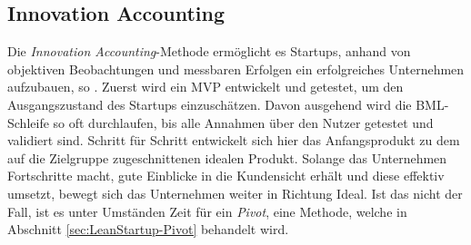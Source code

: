 \subsection*{\label{sec:LeanStartup-InnovationAccounting}\thesubsection\quad Innovation Accounting}
Die \textit{Innovation Accounting}-Methode ermöglicht es Startups, anhand von objektiven Beobachtungen und messbaren Erfolgen ein erfolgreiches Unternehmen aufzubauen, so \citeauthor{TheLeanStartup}. Zuerst wird ein \ac{MVP} entwickelt und getestet, um den Ausgangszustand des Startups einzuschätzen. Davon ausgehend wird die \ac{BML}-Schleife so oft durchlaufen, bis alle Annahmen über den Nutzer getestet und validiert sind. Schritt für Schritt entwickelt sich hier das Anfangsprodukt zu dem auf die Zielgruppe zugeschnittenen idealen Produkt. Solange das Unternehmen Fortschritte macht, gute Einblicke in die Kundensicht erhält und diese effektiv umsetzt, bewegt sich das Unternehmen weiter in Richtung Ideal. Ist das nicht der Fall, ist es unter Umständen Zeit für ein \textit{Pivot}, eine Methode, welche in Abschnitt \ref{sec:LeanStartup-Pivot} behandelt wird.

